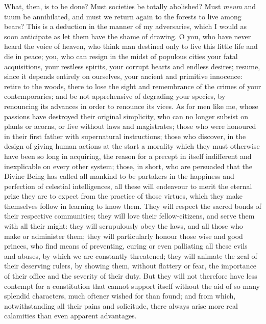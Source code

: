 \documentclass[12pt]{report}
\begin{document}
What, then, is to be done? Must societies be totally abolished? Must \emph{meum} and {tuum} be annihilated, and must we return again to the forests to live among bears? This is a deduction in the manner of my adversaries, which I would as soon anticipate as let them have the shame of drawing. O you, who have never heard the voice of heaven, who think man destined only to live this little life and die in peace; you, who can resign in the midst of populous cities your fatal acquisitions, your restless spirits, your corrupt hearts and endless desires; resume, since it depends entirely on ourselves, your ancient and primitive innocence: retire to the woods, there to lose the sight and remembrance of the crimes of your contemporaries; and be not apprehensive of degrading your species, by renouncing its advances in order to renounce its vices. As for men like me, whose passions have destroyed their original simplicity, who can no longer subsist on plants or acorns, or live without laws and magistrates; those who were honoured in their first father with supernatural instructions; those who discover, in the design of giving human actions at the start a morality which they must otherwise have been so long in acquiring, the reason for a precept in itself indifferent and inexplicable on every other system; those, in short, who are persuaded that the Divine Being has called all mankind to be partakers in the happiness and perfection of celestial intelligences, all these will endeavour to merit the eternal prize they are to expect from the practice of those virtues, which they make themselves follow in learning to know them. They will respect the sacred bonds of their respective communities; they will love their fellow-citizens, and serve them with all their might: they will scrupulously obey the laws, and all those who make or administer them; they will particularly honour those wise and good princes, who find means of preventing, curing or even palliating all these evils and abuses, by which we are constantly threatened; they will animate the zeal of their deserving rulers, by showing them, without flattery or fear, the importance of their office and the severity of their duty. But they will not therefore have less contempt for a constitution that cannot support itself without the aid of so many splendid characters, much oftener wished for than found; and from which, notwithstanding all their pains and solicitude, there always arise more real calamities than even apparent advantages.
\end{document}
